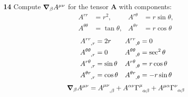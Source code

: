 \documentclass[gr-notes.tex]{subfiles}
\begin{document}
\textbf{14}
Compute $\grad_\beta A^{\mu\nu}$ for the tensor $\boldsymbol{A}$ with components:
%
\begin{align*}
  A^{rr} &= r^2, & A^{r\theta} &= r \sin\theta,
  \\
  A^{\theta\theta} &= \tan\theta, & A^{\theta r} &= r \cos\theta
\end{align*}
%
\begin{align*}
  \tensor{A}{^{rr}_{,r}} &= 2r &
  \tensor{A}{^{rr}_{,\theta}} &= 0
  \\
  \tensor{A}{^{\theta\theta}_{,r}} &= 0 &
  \tensor{A}{^{\theta\theta}_{,\theta}} &= \sec^2\theta
  \\
  \tensor{A}{^{r\theta}_{,r}} &= \sin\theta &
  \tensor{A}{^{r\theta}_{,\theta}} &= r \cos\theta
  \\
  \tensor{A}{^{\theta r}_{,r}} &= \cos\theta &
  \tensor{A}{^{\theta r}_{,\theta}} &= -r \sin\theta
\end{align*}
%
\begin{displaymath}
  \grad_\beta A^{\mu \nu} =
  \tensor{A}{^{\mu \nu}_{,\beta}} +
  A^{\alpha \nu} \tensor{\Gamma}{^\mu_{\alpha \beta}} +
  A^{\mu \alpha} \tensor{\Gamma}{^\nu_{\alpha \beta}}
\end{displaymath}
%
\end{document}

